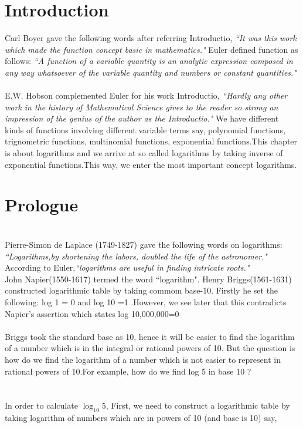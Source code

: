 \documentclass[a4paper,reqno,11pt]{book}
\theoremstyle{plain}%
\theoremstyle{definition}
\begin{document}
	\section{Introduction}
\noindent Carl Boyer gave the following words after referring Introductio, \textit{``It was this 
work which made the function concept basic in mathematics."}\cite{ref 1}
Euler defined function as follows: 
\textit{``A function of a variable quantity is an analytic expression composed in any way whatsoever of the variable quantity and numbers 
or constant quantities."}\cite{ref 2}\\
\\
\indent E.W. Hobson complemented Euler for his work Introductio,
\textit{``Hardly any other work in the history of Mathematical Science gives 
to the reader so strong an impression of the genius of the author as 
the Introductio."}\cite{ref 3} We have different kinds of functions involving different variable terms say,
polynomial functions, trignometric functions, multinomial functions, exponential functions.This chapter is about logarithms and we arrive at so called logarithms by taking inverse of exponential functions.This way, we enter the most important concept logarithms.
\\
\section{Prologue}
\\
Pierre-Simon de Laplace (1749-1827) gave the following words on
logarithms:
\textit{``Logarithms,by shortening the labors, doubled the life of the astronomer."}\cite{ref 4}
According to Euler,\textit{``logarithms are useful in finding intricate roots."}\\

\indent John Napier(1550-1617) termed the word ``logarithm".
Henry Briggs(1561-1631) constructed logarithmic table by taking commom base-10. Firstly he set the following: log 1 = 0 and log 10 =1 .However, we see later that this contradicts Napier's assertion which states log 10,000,000=0\\
\\
\indent Briggs took the standard base as 10, hence it will be easier to find the logarithm of a number which is in the integral or rational powers of 10.
But the question is how do we find the logarithm of a number which is not easier to represent in rational powers of 10.For example, how do we find log 5 in base 10 ?\\
\\
\\
\indent In order to calculate $\log_{10}5$, First, we need to construct a logarithmic table by taking logarithm of  numbers which are in powers of 10 (and base is 10) say,\\
\end{document}
